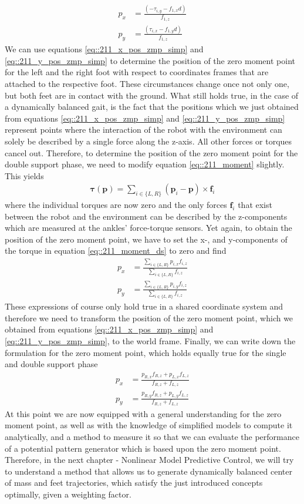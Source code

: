 \begin{align}
	p_x &= \frac{(-\tau_{i,y}-f_{1,x}d)}{f_{1,z}} 
	\label{eq::211_x_pos_zmp_simp}\\
	p_y &= \frac{(\tau_{i,x}-f_{1,y}d)}{f_{1,z}}
	\label{eq::211_y_pos_zmp_simp}
\end{align}
We can use equations \ref{eq::211_x_pos_zmp_simp} and \ref{eq::211_y_pos_zmp_simp} to determine the position of the zero moment point for the left and the right foot with respect to coordinates frames that are attached to the respective foot. These circumstances change once not only one, but both feet are in contact with the ground. What still holds true, in the case of a dynamically balanced gait, is the fact that the positions which we just obtained from equations \ref{eq::211_x_pos_zmp_simp} and \ref{eq::211_y_pos_zmp_simp} represent points where the interaction of the robot with the environment can solely be described by a single force along the z-axis. All other forces or torques cancel out. Therefore, to determine the position of the zero moment point for the double support phase, we need to modify equation \ref{eq::211_moment} slightly. This yields 
\begin{align}
	\bm{\tau}(\bm{p}) = \sum_{i\in\{L, R\}} (\bm{p}_i - \bm{p})\times\bm{f}_i
	\label{eq::211_moment_ds}
\end{align}
where the individual torques are now zero and the only forces $\bm{f}_i$ that exist between the robot and the environment can be described by the z-components which are measured at the ankles' force-torque sensors. Yet again, to obtain the position of the zero moment point, we have to set the x-, and y-components of the torque in equation \ref{eq::211_moment_ds} to zero and find
\begin{align}
	p_x &= \frac{\sum_{i\in\{L, R\}}p_{i,x}f_{i,z}}{\sum_{i\in\{L, R\}}f_{i,z}} \\
	p_y &= \frac{\sum_{i\in\{L, R\}}p_{i,y}f_{i,z}}{\sum_{i\in\{L, R\}}f_{i,z}}
\end{align}
These expressions of course only hold true in a shared coordinate system and therefore we need to transform the position of the zero moment point, which we obtained from equations \ref{eq::211_x_pos_zmp_simp} and \ref{eq::211_y_pos_zmp_simp}, to the world frame. Finally, we can write down the formulation for the zero moment point, which holds equally true for the single and double support phase
\begin{align}
	p_x &= \frac{p_{R,x}f_{R,z}+p_{L,x}f_{L,z}}{f_{R,z}+f_{L,z}} 
	\label{eq::211_double_zmp_x} \\
	p_y &= \frac{p_{R,y}f_{R,z}+p_{L,y}f_{L,z}}{f_{R,z}+f_{L,z}}
	\label{eq::211_double_zmp_y}
\end{align}
At this point we are now equipped with a general understanding for the zero moment point, as well as with the knowledge of simplified models to compute it analytically, and a method to measure it so that we can evaluate the performance of a potential pattern generator which is based upon the zero moment point. Therefore, in the next chapter - Nonlinear Model Predictive Control, we will try to understand a method that allows us to generate dynamically balanced center of mass and feet trajectories, which satisfy the just introduced concepts optimally, given a weighting factor.
